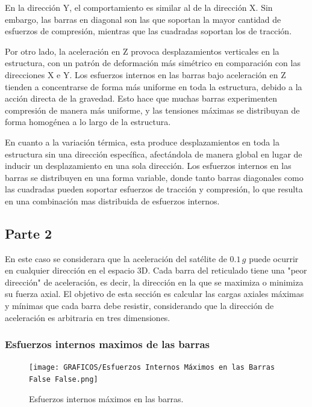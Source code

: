En la dirección Y, el comportamiento es similar al de la dirección X. Sin embargo, las barras en diagonal son las que soportan la mayor cantidad de esfuerzos de compresión, mientras que las cuadradas soportan los de tracción.

Por otro lado, la aceleración en Z provoca desplazamientos verticales en la estructura, con un patrón de deformación más simétrico en comparación con las direcciones X e Y. Los esfuerzos internos en las barras bajo aceleración en Z tienden a concentrarse de forma más uniforme en toda la estructura, debido a la acción directa de la gravedad. Esto hace que muchas barras experimenten compresión de manera más uniforme, y las tensiones máximas se distribuyan de forma homogénea a lo largo de la estructura.

En cuanto a la variación térmica, esta produce desplazamientos en toda la estructura sin una dirección específica, afectándola de manera global en lugar de inducir un desplazamiento en una sola dirección. Los esfuerzos internos en las barras se distribuyen en una forma variable, donde tanto barras diagonales como las cuadradas pueden soportar esfuerzos de tracción y compresión, lo que resulta en una combinación mas distribuida de esfuerzos internos.

\subsection{Parte 2}

En este caso se considerara que la aceleración del satélite de \(0.1 \, g\) puede ocurrir en cualquier dirección en el espacio 3D. Cada barra del reticulado tiene una "peor dirección" de aceleración, es decir, la dirección en la que se maximiza o minimiza su fuerza axial. El objetivo de esta sección es calcular las cargas axiales máximas y mínimas que cada barra debe resistir, considerando que la dirección de aceleración es arbitraria en tres dimensiones.

\subsubsection{Esfuerzos internos maximos de las barras}

\begin{figure}[H]
    \centering
    \texttt{[image: GRAFICOS/Esfuerzos Internos Máximos en las Barras False False.png]}
    \caption{Esfuerzos internos máximos en las barras.}
    \label{fig:imagen9}
\end{figure}

